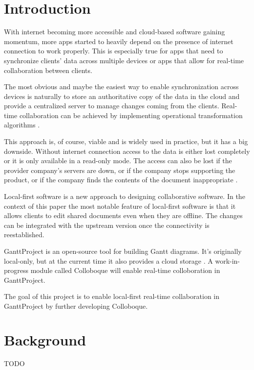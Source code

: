 \documentclass[a4paper, 11pt, oneside]{article}
\theoremstyle{definition}
\begin{document}
\newpage
\tableofcontents

\clearpage
{}

\section{Introduction}

With internet becoming more accessible and cloud-based software gaining momentum, more apps started to heavily depend on the presence of internet connection to work properly. This is especially true for apps that need to synchronize clients' data across multiple devices or apps that allow for real-time collaboration between clients.

The most obvious and maybe the easiest way to enable synchronization across devices is naturally to store an authoritative copy of the data in the cloud and provide a centralized server to manage changes coming from the clients. Real-time collaboration can be achieved by implementing operational transformation algorithms \cite{ot}.

This approach is, of course, viable and is widely used in practice, but it has a big downside. Without internet connection access to the data is either lost completely or it is only available in a read-only mode. The access can also be lost if the provider company's servers are down, or if the company stops supporting the product, or if the company finds the contents of the document inappropriate \cite{googleblock}. 

Local-first software \cite{localfirst} is a new approach to designing collaborative software. In the context of this paper the most notable feature of local-first software is that it allows clients to edit shared documents even when they are offline. The changes can be integrated with the upstream version once the connectivity is reestablished.

GanttProject \cite{ganttsite,ganttrepo} is an open-source tool for building Gantt diagrams. It's originally local-only, but at the current time it also provides a cloud storage \cite{ganttcloudsite}. A work-in-progress module called Colloboque will enable real-time colloboration in GanttProject.

The goal of this project is to enable local-first real-time collaboration in GanttProject by further developing Colloboque.

\section{Background}
TODO
\end{document}
